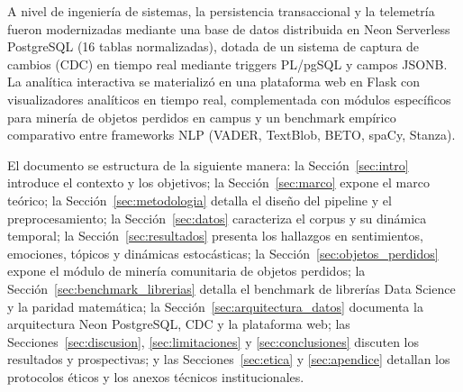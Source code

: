 A nivel de ingeniería de sistemas, la persistencia transaccional y la telemetría fueron modernizadas mediante una base de datos distribuida en Neon Serverless PostgreSQL (16 tablas normalizadas), dotada de un sistema de captura de cambios (CDC) en tiempo real mediante triggers PL/pgSQL y campos JSONB. La analítica interactiva se materializó en una plataforma web en Flask con visualizadores analíticos en tiempo real, complementada con módulos específicos para minería de objetos perdidos en campus y un benchmark empírico comparativo entre frameworks NLP (VADER, TextBlob, BETO, spaCy, Stanza).

El documento se estructura de la siguiente manera: la Sección~\ref{sec:intro} introduce el contexto y los objetivos; la Sección~\ref{sec:marco} expone el marco teórico; la Sección~\ref{sec:metodologia} detalla el diseño del pipeline y el preprocesamiento; la Sección~\ref{sec:datos} caracteriza el corpus y su dinámica temporal; la Sección~\ref{sec:resultados} presenta los hallazgos en sentimientos, emociones, tópicos y dinámicas estocásticas; la Sección~\ref{sec:objetos_perdidos} expone el módulo de minería comunitaria de objetos perdidos; la Sección~\ref{sec:benchmark_librerias} detalla el benchmark de librerías Data Science y la paridad matemática; la Sección~\ref{sec:arquitectura_datos} documenta la arquitectura Neon PostgreSQL, CDC y la plataforma web; las Secciones~\ref{sec:discusion}, \ref{sec:limitaciones} y \ref{sec:conclusiones} discuten los resultados y prospectivas; y las Secciones~\ref{sec:etica} y \ref{sec:apendice} detallan los protocolos éticos y los anexos técnicos institucionales.
